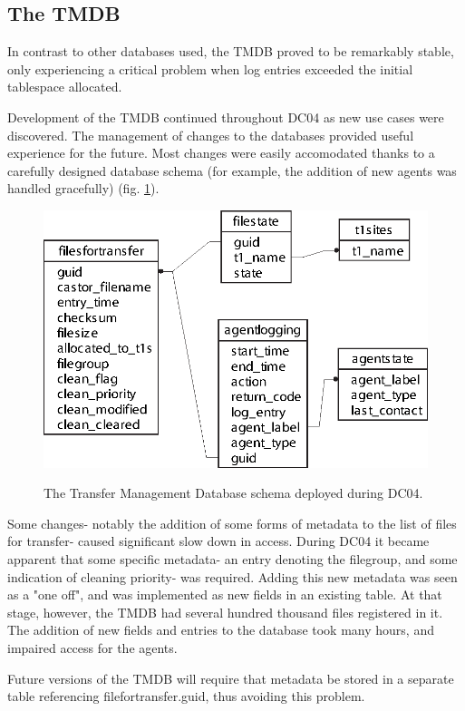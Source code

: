 \documentclass{cmspaper}
\begin{document}
\subsection{The TMDB}
In contrast to other databases used, the TMDB proved to be remarkably
stable, only experiencing a critical problem when log entries exceeded
the initial tablespace allocated.

Development of the TMDB continued throughout DC04 as new use cases were discovered. The management of changes to the databases provided useful experience for the future. Most changes were easily accomodated thanks to a carefully designed database schema (for example, the addition of new agents was handled gracefully) (fig. \ref{fig:schema}).

\begin{figure}[tbp]
\centering
\includegraphics{v1_tmdb.eps}
\label{fig:schema}
\caption{The Transfer Management Database schema deployed during DC04.}
\end{figure} 

Some changes- notably the addition of some forms of metadata to the list of files for transfer- caused significant slow down in access. During DC04 it became apparent that some specific metadata- an entry denoting the filegroup, and some indication of cleaning priority- was required. Adding this new metadata was seen as a "one off", and was implemented as new fields in an existing table. At that stage, however, the TMDB had several hundred thousand files registered in it. The addition of new fields and entries to the database took many hours, and impaired access for the agents.

Future versions of the TMDB will require that metadata be stored in a separate table referencing filefortransfer.guid, thus avoiding this problem.
\end{document}
